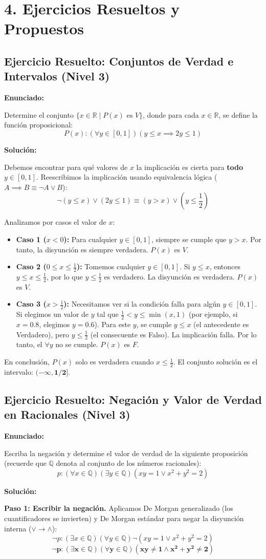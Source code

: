 \documentclass[11pt]{article}
\newenvironment{ejercicios}{\section*{4. Ejercicios Resueltos y Propuestos}}{}
\newenvironment{ejercicioresuelto}[2]{\subsection*{Ejercicio Resuelto: #1 \hfill \normalfont\small(#2)}}{ }
\newcommand{\enunciado}[1]{\textbf{Enunciado:}\par#1\par\medskip}
\newcommand{\solucion}[1]{\textbf{Solución:}\par#1\par\bigskip}
\begin{document}
\begin{ejercicios}
  \begin{ejercicioresuelto}{Conjuntos de Verdad e Intervalos}{Nivel 3}
    \enunciado{
      Determine el conjunto $\{x \in \mathbb{R} \mid P(x) \text{ es } V\}$, donde para cada $x \in \mathbb{R}$, se define la función proposicional:
      \[ P(x) : (\forall y \in [0, 1])(y \leq x \implies 2y \leq 1) \]
    }
    \solucion{
      Debemos encontrar para qué valores de $x$ la implicación es cierta para \textbf{todo} $y \in [0, 1]$. 
      Reescribimos la implicación usando equivalencia lógica ($A \implies B \equiv \neg A \vee B$):
      \[ \neg(y \leq x) \vee (2y \leq 1) \equiv (y > x) \vee \left(y \leq \frac{1}{2}\right) \]
      
      Analizamos por casos el valor de $x$:
      \begin{itemize}
          \item \textbf{Caso 1 ($x < 0$):} Para cualquier $y \in [0, 1]$, siempre se cumple que $y > x$. Por tanto, la disyunción es siempre verdadera. $P(x)$ es $V$.
          \item \textbf{Caso 2 ($0 \leq x \leq \frac{1}{2}$):} Tomemos cualquier $y \in [0, 1]$. Si $y \leq x$, entonces $y \leq x \leq \frac{1}{2}$, por lo que $y \leq \frac{1}{2}$ es verdadero. La disyunción es verdadera. $P(x)$ es $V$.
          \item \textbf{Caso 3 ($x > \frac{1}{2}$):} Necesitamos ver si la condición falla para algún $y \in [0, 1]$. 
          Si elegimos un valor de $y$ tal que $\frac{1}{2} < y \leq \min(x, 1)$ (por ejemplo, si $x=0.8$, elegimos $y=0.6$). 
          Para este $y$, se cumple $y \leq x$ (el antecedente es Verdadero), pero $y \leq \frac{1}{2}$ (el consecuente es Falso). La implicación falla. Por lo tanto, el $\forall y$ no se cumple. $P(x)$ es $F$.
      \end{itemize}
      
      En conclusión, $P(x)$ solo es verdadera cuando $x \leq \frac{1}{2}$.
      El conjunto solución es el intervalo: $\mathbf{(-\infty, 1/2]}$.
    }
  \end{ejercicioresuelto}

  \begin{ejercicioresuelto}{Negación y Valor de Verdad en Racionales}{Nivel 3}
    \enunciado{
      Escriba la negación y determine el valor de verdad de la siguiente proposición (recuerde que $\mathbb{Q}$ denota al conjunto de los números racionales):
      \[ p : (\forall x \in \mathbb{Q})(\exists y \in \mathbb{Q})(xy = 1 \vee x^2 + y^2 = 2) \]
    }
    \solucion{
      \textbf{Paso 1: Escribir la negación.}
      Aplicamos De Morgan generalizado (los cuantificadores se invierten) y De Morgan estándar para negar la disyunción interna ($\vee \to \wedge$):
      \[ \neg p : (\exists x \in \mathbb{Q})(\forall y \in \mathbb{Q}) \neg(xy = 1 \vee x^2 + y^2 = 2) \]
      \[ \mathbf{\neg p : (\exists x \in \mathbb{Q})(\forall y \in \mathbb{Q}) (xy \neq 1 \wedge x^2 + y^2 \neq 2)} \]

}
\end{ejercicioresuelto}
\end{ejercicios}
\end{document}
